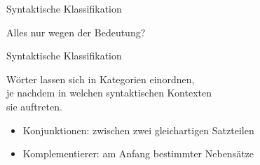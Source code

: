 \begin{frame}
  {Syntaktische Klassifikation}
  \pause
  \begin{exe}
    \ex
    \begin{xlist}
      \pause
      \pause
      \pause
    \end{xlist}
    \pause
    \Zeile
    \ex
    \begin{xlist}
      \pause
    \end{xlist}
  \end{exe}
    \pause
    \Zeile
    Alles nur wegen der Bedeutung?
\end{frame}

\begin{frame}
  {Syntaktische Klassifikation}
  \pause
  \begin{center}
    \Large Wörter lassen sich in Kategorien einordnen,\\
    je nachdem \alert{in welchen syntaktischen Kontexten\\
    sie auftreten}.
  \end{center}
  \Zeile
  \pause
  \begin{itemize}[<+->]
    \item Konjunktionen: zwischen zwei gleichartigen Satzteilen
    \item Komplementierer: am Anfang bestimmter Nebensätze
  \end{itemize}
\end{frame}



